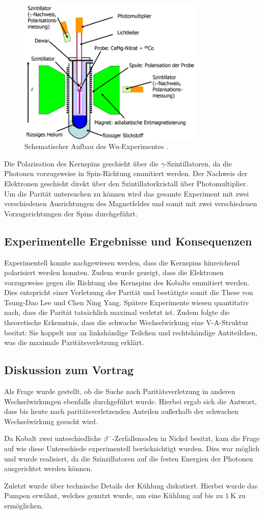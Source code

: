 \begin{figure}
  \centering
  \includegraphics[height=7.0cm]{ressources/wu.png}
  \caption{Schematischer Aufbau des Wu-Experimentes \cite{wu}.}
  \label{fig:wu}
\end{figure}

Die Polarisation des Kernspins geschieht über die $\gamma$-Szintillatoren, da die Photonen vorzugsweise in Spin-Richtung emmitiert werden.
Der Nachweis der Elektronen geschieht direkt über den Szintillatorkristall über Photomultiplier.
Um die Parität untersuchen zu können wird das gesamte Experiment mit zwei verschiedenen Ausrichtungen des Magnetfeldes und somit mit zwei verschiedenen Vorzugsrichtungen der Spins durchgeführt.

\subsection{Experimentelle Ergebnisse und Konsequenzen}
Experimentell konnte nachgewiesen werden, dass die Kernspins hinreichend polarisiert werden konnten.
Zudem wurde gezeigt, dass die Elektronen vorzugsweise gegen die Richtung des Kernspins des Kobalts emmitiert werden.
Dies entspricht einer Verletzung der Parität und bestätigte somit die These von Tsung-Dao Lee und Chen Ning Yang.
Spätere Experimente wiesen quantitativ nach, dass die Parität tatsächlich maximal verletzt ist.
Zudem folgte die theoretische Erkenntnis, dass die schwache Wechselwirkung eine V-A-Struktur besitzt:
Sie koppelt nur an linkshändige Teilchen und rechtshändige Antiteilchen, was die maximale Paritätsverletzung erklärt.

\subsection{Diskussion zum Vortrag}
Als Frage wurde gestellt, ob die Suche nach Paritätsverletzung in anderen Wechselwirkungen ebenfalls durchgeführt wurde.
Hierbei ergab sich die Antwort, dass bis heute nach paritätsverletzenden Anteilen außerhalb der schwachen Wechselwirkung gesucht wird.

Da Kobalt zwei unteschiedliche $\beta^-$-Zerfallsmoden in Nickel besitzt, kam die Frage auf wie diese Unterschiede experimentell berücksichtigt wurden.
Dies war möglich und wurde realisiert, da die Szinzillatoren auf die festen Energien der Photonen ausgerichtet werden können.

Zuletzt wurde über technische Details der Kühlung diskutiert.
Hierbei wurde das Pumpen erwähnt, welches genutzt wurde, um eine Kühlung auf bis zu $\SI{1}{\kelvin}$ zu ermöglichen.
